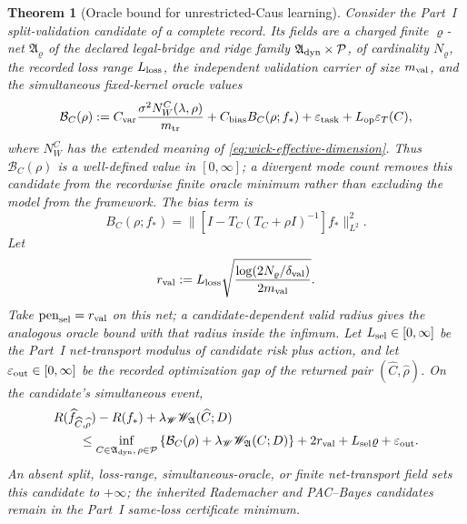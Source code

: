 \documentclass[11pt]{article}
\numberwithin{section}{part}
\theoremstyle{plain}
\newtheorem{theorem}{Theorem}[section]
\theoremstyle{definition}
\theoremstyle{remark}
\begin{document}
\begin{theorem}[Oracle bound for unrestricted-Caus learning]
\label{thm:wick-free-caus-oracle}
Consider the Part~I split-validation candidate of a complete record.  Its
fields are a charged finite \(\varrho\)-net
\(\mathfrak A_{\varrho}\) of the declared legal-bridge and ridge family
\(\mathfrak A_{\rm dyn}\times\mathcal P\), of cardinality
\(N_{\varrho}\), the recorded loss range \(L_{\rm loss}\), the independent
validation carrier of size \(m_{\rm val}\), and the simultaneous fixed-kernel
oracle values
\begin{equation}
 \label{eq:wick-free-candidate-bound}
 \mathcal B_C(\rho)
 :=C_{\rm var}\frac{\sigma^2N_W^C(\lambda,\rho)}{m_{\rm tr}}
 +C_{\rm bias}B_C(\rho;f_*)
 +\varepsilon_{\rm task}
 +L_{\rm op}\varepsilon_T(C),
\end{equation}
where \(N_W^C\) has the extended meaning of
\eqref{eq:wick-effective-dimension}.  Thus \(\mathcal B_C(\rho)\) is a
well-defined value in \([0,\infty]\); a divergent mode count removes this
candidate from the recordwise finite oracle minimum rather than excluding the
model from the framework.  The bias term is
\[
 B_C(\rho;f_*)
 =\|[I-T_C(T_C+\rho I)^{-1}]f_*\|_{L^2}^2.
\]
Let
\begin{equation}
 \label{eq:wick-free-selection-radius}
 r_{\rm val}
 :=L_{\rm loss}
 \sqrt{\frac{\log(2N_{\varrho}/\delta_{\rm val})}{2m_{\rm val}}}.
\end{equation}
Take \(\operatorname{pen}_{\rm sel}=r_{\rm val}\) on this net; a
candidate-dependent valid radius gives the analogous oracle bound with that
radius inside the infimum.  Let \(L_{\rm sel}\in[0,\infty]\) be the Part~I
net-transport modulus of candidate risk plus action, and let
\(\varepsilon_{\rm out}\in[0,\infty]\) be the recorded optimization gap of
the returned pair \((\widehat C,\widehat\rho)\).  On the candidate's
simultaneous event,
\begin{align}
 \label{eq:wick-free-oracle-bound}
 &R(\widehat f_{\widehat C,\widehat\rho})-R(f_*)
 +\lambda_{\mathscr W}\mathscr W_{\mathfrak A}(\widehat C;D)
 \notag\\
 &\qquad\le
 \inf_{C\in\mathfrak A_{\rm dyn},\,\rho\in\mathcal P}
 \left\{\mathcal B_C(\rho)
 +\lambda_{\mathscr W}\mathscr W_{\mathfrak A}(C;D)\right\}
 +2r_{\rm val}+L_{\rm sel}\varrho+\varepsilon_{\rm out}.
\end{align}
An absent split, loss-range, simultaneous-oracle, or finite net-transport
field sets this candidate to \(+\infty\); the inherited Rademacher and
PAC--Bayes candidates remain in the Part~I same-loss certificate minimum.

\end{theorem}
\end{document}
